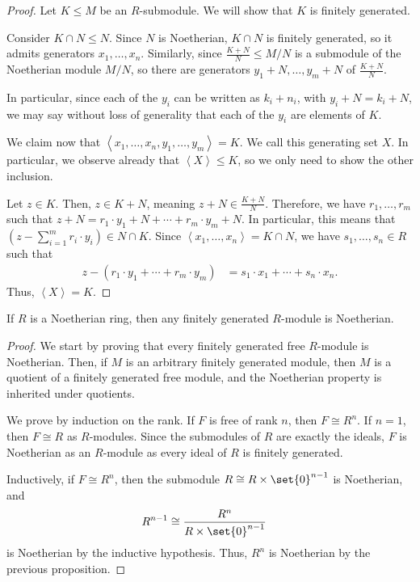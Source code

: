 \documentclass[10pt]{mypackage}
\begin{document}
\begin{proof}
  Let $K\leq M$ be an $R$-submodule. We will show that $K$ is finitely generated.%

  Consider $K\cap N\leq N$. Since $N$ is Noetherian, $K\cap N$ is finitely generated, so it admits generators $x_1,\dots,x_n$. Similarly, since $\frac{K+N}{N}\leq M/N$ is a submodule of the Noetherian module $M/N$, so there are generators $y_1 + N,\dots,y_m + N$ of $\frac{K+N}{N}$.%

  In particular, since each of the $y_i$ can be written as $k_i + n_i$, with $y_i + N = k_i + N$, we may say without loss of generality that each of the $y_i$ are elements of $K$.%

  We claim now that $\left\langle x_1,\dots,x_n,y_1,\dots,y_m \right\rangle = K$. We call this generating set $X$. In particular, we observe already that $\left\langle X \right\rangle \leq K$, so we only need to show the other inclusion.%

  Let $z\in K$. Then, $z\in K + N$, meaning $z + N \in \frac{K+N}{N}$. Therefore, we have $r_1,\dots,r_m$ such that $z + N = r_1\cdot y_1 + N + \cdots + r_m\cdot y_m + N$. In particular, this means that $\left( z - \sum_{i=1}^{m}r_i\cdot y_i \right)\in N\cap K$. Since $\left\langle x_1,\dots,x_n \right\rangle = K\cap N$, we have $s_1,\dots,s_n\in R$ such that
  \begin{align*}
    z - \left( r_1\cdot y_1 + \cdots + r_m\cdot y_m \right) &= s_1\cdot x_1 + \cdots + s_n\cdot x_n.
  \end{align*}
  Thus, $\left\langle X \right\rangle = K$.
\end{proof}
\begin{theorem}
  If $R$ is a Noetherian ring, then any finitely generated $R$-module is Noetherian.
\end{theorem}
\begin{proof}
  We start by proving that every finitely generated free $R$-module is Noetherian. Then, if $M$ is an arbitrary finitely generated module, then $M$ is a quotient of a finitely generated free module, and the Noetherian property is inherited under quotients.%

  We prove by induction on the rank. If $F $ is free of rank $n$, then $F\cong R^{n}$. If $n = 1$, then $F\cong R$ as $R$-modules. Since the submodules of $R$ are exactly the ideals, $F$ is Noetherian as an $R$-module as every ideal of $R$ is finitely generated.%

  Inductively, if $F \cong R^{n}$, then the submodule $R\cong R\times \set{0}^{n-1}$ is Noetherian, and
  \begin{align*}
    R^{n-1} &\cong \frac{R^{n}}{R\times \set{0}^{n-1}}
  \end{align*}
  is Noetherian by the inductive hypothesis. Thus, $R^{n}$ is Noetherian by the previous proposition.
\end{proof}
\end{document}
